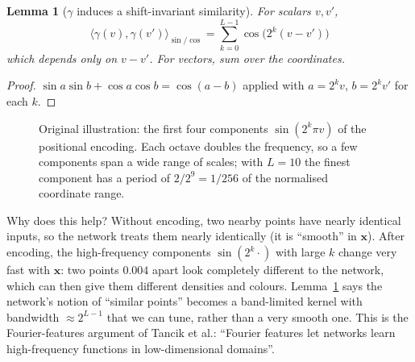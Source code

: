 \documentclass[11pt,a4paper]{article}
\newcommand{\xx}{\boldsymbol{x}}
\theoremstyle{definition}
\theoremstyle{plain}
\newtheorem{lemma}{Lemma}[section]
\begin{document}
\begin{lemma}[$\gamma$ induces a shift-invariant similarity]\label{lem:gammakernel}
For scalars $v,v'$,
\[
\langle\gamma(v),\gamma(v')\rangle_{\sin/\cos}=\sum_{k=0}^{L-1}\cos\!\big(2^k(v-v')\big)
\]
which depends only on $v-v'$. For vectors, sum over the coordinates.
\end{lemma}
\begin{proof}
$\sin a\sin b+\cos a\cos b=\cos(a-b)$ applied with $a=2^kv$, $b=2^kv'$ for each $k$.
\end{proof}

\begin{figure}[H]
\centering
{}
\caption{Original illustration: the first four components $\sin(2^k\pi v)$ of the positional encoding. Each octave doubles the frequency, so a few components span a wide range of scales; with $L=10$ the finest component has a period of $2/2^{9}=1/256$ of the normalised coordinate range.}
\end{figure}

\begin{intuition}
Why does this help? Without encoding, two nearby points have nearly identical inputs, so the network treats them nearly identically (it is ``smooth'' in $\xx$). After encoding, the high-frequency components $\sin(2^{k}\cdot)$ with large $k$ change very fast with $\xx$: two points $0.004$ apart look completely different to the network, which can then give them different densities and colours. Lemma~\ref{lem:gammakernel} says the network's notion of ``similar points'' becomes a band-limited kernel with bandwidth $\approx 2^{L-1}$ that we can tune, rather than a very smooth one. This is the Fourier-features argument of Tancik et al.: ``Fourier features let networks learn high-frequency functions in low-dimensional domains''.
\end{intuition}
\end{document}

